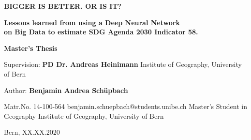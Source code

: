 
	

\clearpage
\thispagestyle{empty}
\setlength{\hoffset}{-20mm}




\begin{tcolorbox}[standard jigsaw, colback=black, opacityback=1, width=620, opacityframe=0, coltext=white]
	

	{\Huge \textbf{BIGGER IS BETTER. OR IS IT?}}\bigbreak



		\textbf{{\Large Lessons learned from using a Deep Neural Network\\ on Big Data to estimate SDG Agenda 2030 Indicator 58.}}



\end{tcolorbox}


\vspace{4cm}

\begin{tcolorbox}[standard jigsaw, colback=black, opacityback=0, width=350, opacityframe=0, coltext=white]
{	
	\smallbreak
	
	\Large 
	\textbf{Master's Thesis}
	\bigbreak\bigbreak
	
	\large
	\smallbreak
	Supervision: \bigbreak
	\textbf{PD Dr. Andreas Heinimann\bigbreak}
	Institute of Geography, University of Bern
	\bigbreak
	\bigbreak
	
	
	Author:\bigbreak	
	\textbf{Benjamin Andrea Schüpbach} \bigbreak
	
	Matr.No. 14-100-564
	\smallbreak
	benjamin.schuepbach@students.unibe.ch
	\smallbreak
	Master's Student in Geography
	\smallbreak
	Institute of Geography, University of Bern
	\bigbreak
	

	Bern, XX.XX.2020


}
\end{tcolorbox}


\clearpage
\setlength{\hoffset}{0mm}





\newpage